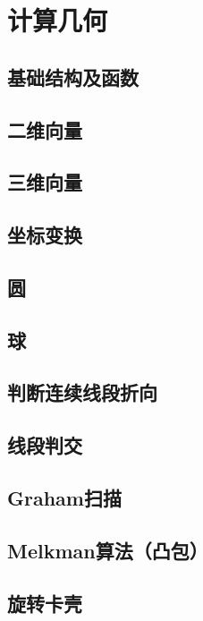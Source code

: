 \section{计算几何}
\subsection{基础结构及函数}
\subsection{二维向量}
\subsection{三维向量}
\subsection{坐标变换}
\subsection{圆}
\subsection{球}
\subsection{判断连续线段折向}
\subsection{线段判交}
\subsection{Graham扫描}
\subsection{Melkman算法（凸包）}
\subsection{旋转卡壳}
